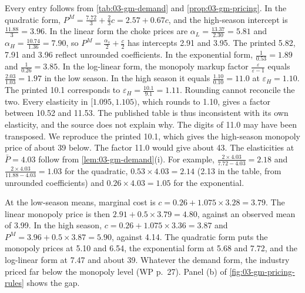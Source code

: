 Every entry follows from \cref{tab:03-gm-demand} and \cref{prop:03-gm-pricing}. In the quadratic form,
$P^M = \frac{7.72}{3} + \frac{2}{3}c = 2.57 + 0.67c$, and the high-season intercept is $\frac{11.88}{3} =
3.96$. In the linear form the choke prices are $\alpha_L = \frac{13.37}{2.30} = 5.81$ and $\alpha_H =
\frac{10.74}{1.36} = 7.90$, so $P^M = \frac{\alpha_s}{2} + \frac{c}{2}$ has intercepts 2.91 and 3.95. The
printed 5.82, 7.91 and 3.96 reflect unrounded coefficients. In the exponential form, $\frac{1}{0.53} = 1.89$
and $\frac{1}{0.26} = 3.85$. In the log-linear form, the monopoly markup factor
$\frac{\varepsilon}{\varepsilon - 1}$ equals $\frac{2.03}{1.03} = 1.97$ in the low season. In the high
season it equals $\frac{1.10}{0.10} = 11.0$ at $\varepsilon_H = 1.10$. The printed 10.1 corresponds to
$\varepsilon_H = \frac{10.1}{9.1} = 1.11$. Rounding cannot reconcile the two. Every elasticity in $[1.095,
1.105)$, which rounds to 1.10, gives a factor between 10.52 and 11.53. The published table is thus inconsistent
with its own elasticity, and the source does not explain why. The digits of 11.0 may have been transposed. We
reproduce the printed 10.1, which gives the high-season monopoly price of about 39 below. The factor 11.0 would
give about 43. The elasticities at $\bar P = 4.03$ follow from \cref{lem:03-gm-demand}(i). For example,
$\frac{2 \times 4.03}{7.72 - 4.03} = 2.18$ and $\frac{2 \times 4.03}{11.88 - 4.03} = 1.03$ for the quadratic,
$0.53 \times 4.03 = 2.14$ (2.13 in the table, from unrounded coefficients) and $0.26 \times 4.03 = 1.05$ for the
exponential.

At the low-season means, marginal cost is $c = 0.26 + 1.075 \times 3.28 = 3.79$. The linear monopoly price
is then $2.91 + 0.5 \times 3.79 = 4.80$, against an observed mean of 3.99. In the high season, $c = 0.26 +
1.075 \times 3.36 = 3.87$ and $P^M = 3.96 + 0.5 \times 3.87 = 5.90$, against 4.14. The quadratic form puts
the monopoly prices at 5.10 and 6.54, the exponential form at 5.68 and 7.72, and the log-linear form at 7.47
and about 39. Whatever the demand form, the industry priced far below the monopoly level (WP p.~27). Panel (b) of
\cref{fig:03-gm-pricing-rules} shows the gap.

